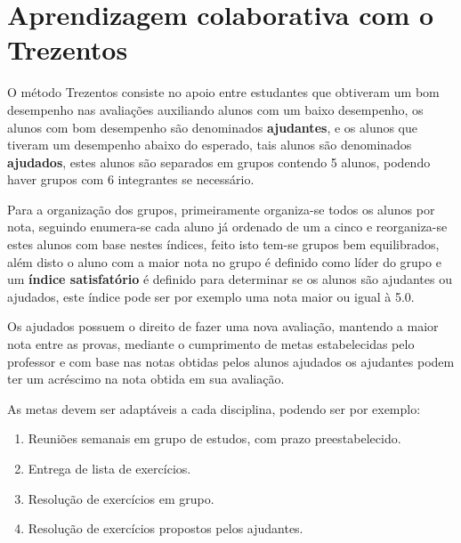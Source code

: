 \chapter[Aprendizagem colaborativa com o Trezentos]{Aprendizagem colaborativa com o Trezentos} 

O método Trezentos consiste no apoio entre estudantes que obtiveram um bom desempenho nas avaliações auxiliando alunos com um baixo desempenho, os alunos com bom desempenho são denominados \textbf{ajudantes}, e os alunos que tiveram um desempenho abaixo do esperado, tais alunos são denominados \textbf{ajudados}, estes alunos são separados em grupos contendo 5 alunos, podendo haver grupos com 6 integrantes se necessário. 

Para a organização dos grupos, primeiramente organiza-se todos os alunos por nota, seguindo enumera-se cada aluno já ordenado de um a cinco e reorganiza-se estes alunos com base nestes índices, feito isto tem-se grupos bem equilibrados, além disto o aluno com a maior nota no grupo é definido como líder do grupo e um \textbf{índice satisfatório} é definido para determinar se os alunos são ajudantes ou ajudados, este índice pode ser por exemplo uma nota maior ou igual à 5.0. 

Os ajudados possuem o direito de fazer uma nova avaliação, mantendo a maior nota entre as provas, mediante o cumprimento de metas estabelecidas pelo professor e com base nas notas obtidas pelos alunos ajudados os ajudantes podem ter um acréscimo na nota obtida em sua avaliação. 

As metas devem ser adaptáveis a cada disciplina, podendo ser por exemplo: 

\begin{enumerate} 
\item Reuniões semanais em grupo de estudos, com prazo preestabelecido. 
\item Entrega de lista de exercícios. 
\item Resolução de exercícios em grupo. 
\item Resolução de exercícios propostos pelos ajudantes. 
\end{enumerate} 

